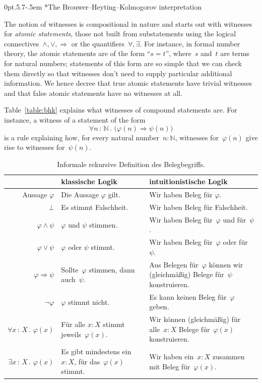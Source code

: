 \documentclass[10pt,reqno,a4paper,openany]{amsbook}
\makeatletter
\theoremstyle{definition}
\theoremstyle{plain}
\theoremstyle{remark}
\newcommand{\NN}{\mathbb{N}}
\newcommand{\?}{\,{:}\,}
\renewcommand{\_}{\mathpunct{.}\,}
\def\subsection{\@startsection{subsection}{2}%
  {0pt}{.5\linespacing\@plus.7\linespacing}{-.5em}%
  {\normalfont\bfseries}}
\makeatother
\begin{document}
\subsection*{The Brouwer--Heyting--Kolmogorov interpretation}

The notion of witnesses is compositional in nature and starts out with witnesses for \emph{atomic
statements}, those not built from substatements using the logical
connectives~$\wedge,\vee,\Rightarrow$ or the quantifiers~$\forall,\exists$. For
instance, in formal number theory, the atomic statements are of the form
``$s = t$'',
where~$s$ and~$t$ are terms for natural numbers; statements of this form are so
simple that we can check them directly so that witnesses don't need to supply
particular additional information. We hence decree that true atomic statements
have trivial witnesses and that false atomic statements have no witnesses at
all.

Table~\ref{table:bhk} explains what witnesses of compound statements are. For
instance, a witness of a statement of the form
\[ \forall n \? \NN\_ \bigl(\varphi(n) \Rightarrow \psi(n)\bigr) \]
is a rule explaining how, for every natural number~$n : \NN$, witnesses
for~$\varphi(n)$ give rise to witnesses for~$\psi(n)$.

\begin{table}
  \centering
  \small
  \renewcommand{\arraystretch}{1.3}
  \begin{tabular}{@{}rp{5.9cm}p{6.5cm}@{}}
    \toprule
    & {klassische Logik} & {intuitionistische Logik}
    \\\midrule
    Aussage $\varphi$ & Die Aussage $\varphi$ gilt. & Wir haben Beleg für $\varphi$. \\
    $\bot$ & Es stimmt Falschheit. & Wir haben Beleg für Falschheit. \\
    $\varphi \wedge \psi$ & $\varphi$ und $\psi$ stimmen. & Wir haben Beleg für~$\varphi$ und für~$\psi$. \\
    $\varphi \vee \psi$ & $\varphi$ oder $\psi$ stimmt. & Wir haben Beleg für~$\varphi$ oder für~$\psi$. \\
    $\varphi \Rightarrow \psi$ & Sollte~$\varphi$ stimmen, dann auch~$\psi$. &
    Aus Belegen für~$\varphi$ können wir (gleich\-mä\-ßig) Belege für~$\psi$ konstruieren. \\
    $\neg\varphi$ &
      $\varphi$ stimmt nicht. &
      Es kann keinen Beleg für~$\varphi$ geben. \\
    $\forall x\?X\_ \varphi(x)$ & Für alle $x : X$ stimmt jeweils~$\varphi(x).$ &
      Wir können (gleichmäßig) für alle~$x : X$ Belege für~$\varphi(x)$ konstruieren. \\
    $\exists x\?X\_ \varphi(x)$ & \raggedright Es gibt mindestens ein~$x : X$, für das~$\varphi(x)$
    stimmt. & {\raggedright
      Wir haben ein~$x : X$ zusammen mit Beleg für~$\varphi(x).$} \\
    \bottomrule
  \end{tabular}
  \caption{\label{bhk}Informale rekursive Definition des Belegbegriffs.}
\end{table}
\end{document}
